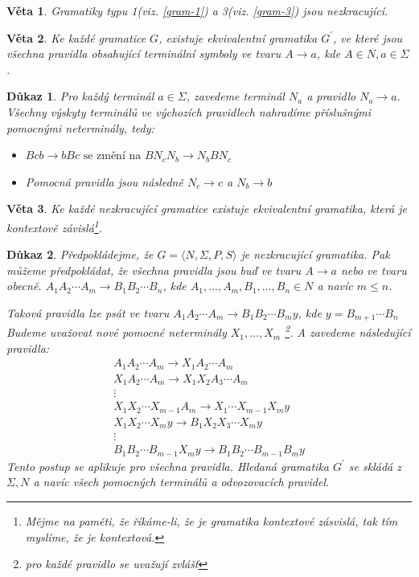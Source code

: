 \documentclass[10pt, a4paper, titlepage]{article}
\theoremstyle{note}
\newtheorem{veta}{Věta}
\newtheorem{dukaz}{Důkaz}
\begin{document}
\begin{veta}
Gramatiky typu 1(viz. \ref{gram-1}) a 3(viz. \ref{gram-3}) jsou nezkracující.
\end{veta}

\begin{veta}
Ke každé gramatice $G$, existuje ekvivalentní gramatika $G^{'}$, ve které
jsou všechna pravidla obsahující terminální symboly ve tvaru $A \rightarrow a$, kde $A \in N, a \in \Sigma$.
\end{veta}

\begin{dukaz}
Pro každý terminál $a \in \Sigma$, zavedeme terminál $N_{a}$ a pravidlo $N_{a} \rightarrow a$.
Všechny výskyty terminálů ve výchozích pravidlech nahradíme příslušnými pomocnými neterminály, tedy:
\begin{itemize}
\item
$Bcb \rightarrow bBc \text{ se změní na } BN_{c}N_{b} \rightarrow N_{b} BN_{c}$

\item
Pomocná pravidla jsou následně $N_{c} \rightarrow c$ a $N_{b} \rightarrow b$
\end{itemize}
\end{dukaz}

\begin{veta}
Ke každé nezkracující gramatice existuje ekvivalentní gramatika, která je kontextově závislá\footnote{Mějme na paměti, že říkáme-li, že je
gramatika kontextové zásvislá, tak tím myslíme, že je kontextová.}.
\end{veta}

\begin{dukaz}
Předpokládejme, že $G = \langle N, \Sigma, P, S \rangle$ je nezkracující gramatika. Pak můžeme předpokládat, 
že všechna pravidla jsou buď ve tvaru $A \rightarrow a$ nebo ve tvaru obecně. 
$A_{1} A_{2} \cdots A_{m} \rightarrow B_{1} B_{2} \cdots B_{n}$, kde $A_{1}, \ldots,A_{m}, B_{1}, \ldots,B_{n} \in N$ a navíc $m \leq n$. 

Taková pravidla lze psát ve tvaru $A_{1} A_{2} \cdots A_{m} \rightarrow B_{1} B_{2} \cdots B_{m}y$, kde $y = B_{m+1} \cdots B_{n}$ 
Budeme uvažovat nové pomocné neterminály $X_{1},...,X_{m}$ \footnote{pro každé pravidlo se uvažují zvlášť}. 
A zavedeme následující pravidla:
\begin{gather*}
A_{1} A_{2} \cdots A_{m} \rightarrow X_{1} A_{2} \cdots A_{m} \\
X_{1} A_{2} \cdots A_{m} \rightarrow X_{1} X_{2} A_{3} \cdots A_{m} \\
\vdots \\
X_{1} X_{2} \cdots X_{m-1} A_{m} \rightarrow X_{1} \cdots X_{m-1} X_{m}y \\
X_{1} X_{2} \cdots X_{m}y \rightarrow B_{1} X_{2} X_{3} \cdots X_{m}y \\
\vdots \\
B_{1} B_{2} \cdots B_{m-1} X_{m}y \rightarrow B_{1} B_{2} \cdots B_{m-1}B_{m}y
\end{gather*}
Tento postup se aplikuje pro všechna pravidla. Hledaná gramatika $G^{'}$ se skládá
z $\Sigma, N$ a navíc všech pomocných terminálů a odvozovacích pravidel.
\end{dukaz}
\end{document}
